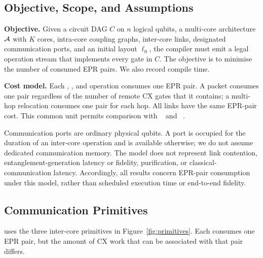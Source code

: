 \subsection{Objective, Scope, and Assumptions}
\label{sec:scope}

\textbf{Objective.} Given a circuit DAG $C$ on $n$ logical qubits, a
multi-core architecture $\mathcal{A}$ with $K$ cores, intra-core coupling graphs,
inter-core links, designated communication ports, and an initial layout
$\ell_0$, the compiler must emit a legal operation stream that implements
every gate in $C$. The objective is to minimise the number of consumed
EPR pairs. We also record compile time.

\textbf{Cost model.} Each \TeleData{}, \TeleGate{}, and
\TeleGatePacket{} operation consumes one EPR pair. A packet consumes one
pair regardless of the number of remote CX gates that it contains; a
multi-hop \TeleData{} relocation consumes one pair for each hop. All links
have the same EPR-pair cost. This common unit permits comparison with
\TeleSABRE{}~\cite{russo2025telesabre} and \dSABRE{}~\cite{lidsabre}.

Communication ports are ordinary physical qubits. A port is occupied for
the duration of an inter-core operation and is available otherwise; we do
not assume dedicated communication memory. The model does not represent
link contention, entanglement-generation latency or fidelity, purification,
or classical-communication latency. Accordingly, all results concern
EPR-pair consumption under this model, rather than scheduled execution
time or end-to-end fidelity. 

\subsection{Communication Primitives}
\label{sec:primitives}

\PORTER{} uses the three inter-core primitives in
Figure~\ref{fig:primitives}. Each consumes one EPR pair, but the amount of
CX work that can be associated with that pair differs.

